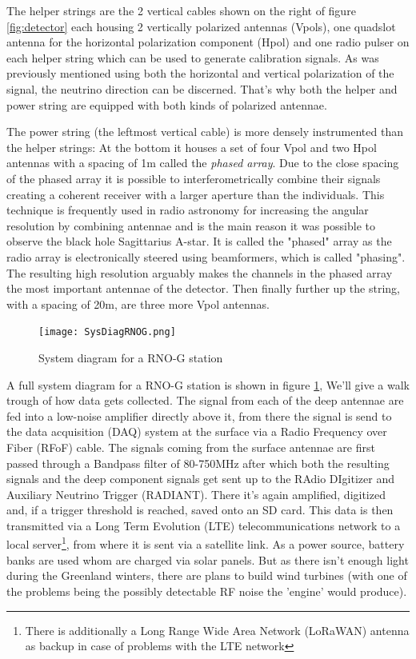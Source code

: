 The helper strings are the 2 vertical cables shown on the right of figure
\ref{fig:detector} each housing 2 vertically polarized antennas (Vpols), one
quadslot antenna for the horizontal polarization component (Hpol) and one radio
pulser on each helper string which can be used to generate calibration signals.
As was previously mentioned using both the horizontal and vertical polarization of the
signal, the neutrino direction can be discerned. That's why both the helper and power 
string are equipped with both kinds of polarized antennae.

The power string (the leftmost vertical cable) is more densely instrumented
than the helper strings: At the bottom it houses a set of four Vpol and two
Hpol antennas with a spacing of 1m called the \textit{phased array}\cite{Allison_2019}. 
Due to the close spacing of the phased array it is possible to
interferometrically combine their signals creating a coherent receiver with a 
larger aperture than the individuals. This technique is frequently used in radio astronomy
for increasing the angular resolution by combining antennae and is the main
reason it was possible to observe the black hole Sagittarius A-star\cite{SqrA*}.
It is called the "phased" array as the radio array is electronically
steered using beamformers, which is called "phasing".
The resulting high resolution arguably makes the channels in the phased array the most important 
antennae of the detector.
Then finally further up the string, with a spacing of 20m, are three more Vpol antennas.
\begin{figure}
  \centering
  \texttt{[image: SysDiagRNOG.png]}
  \caption{System diagram for a RNO-G station }
  \label{fig:SysDiag}
\end{figure}

A full system diagram for a RNO-G station is shown in figure \ref{fig:SysDiag},
We'll give a walk trough of how data gets collected.  The signal from each of
the deep antennae are fed into a low-noise amplifier directly above it\cite{Aguilar_2021}, from
there the signal is send to the data acquisition (DAQ) system at the surface
via a Radio Frequency over Fiber (RFoF) cable.  The signals coming from the
surface antennae are first passed through a Bandpass filter of
80-750MHz after which both the resulting signals and the deep component signals get sent
up to the RAdio DIgitizer and Auxiliary Neutrino Trigger (RADIANT). There it's
again amplified, digitized and, if a trigger threshold is reached, saved onto
an SD card. This data is then transmitted via a Long Term Evolution (LTE)
telecommunications network to a local server\footnote{There is additionally a
Long Range Wide Area Network (LoRaWAN) antenna as backup in case of problems
with the LTE network}, from where it is sent via a satellite link.
As a power source, battery banks are used whom are charged via solar panels.
But as there isn't enough light during the Greenland winters, there are plans to
build wind turbines (with one of the problems being the possibly detectable RF
noise the 'engine' would produce).

